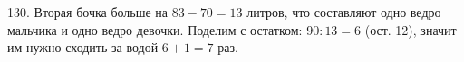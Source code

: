 130. Вторая бочка больше на $83-70=13$ литров, что составляют одно ведро мальчика и одно ведро девочки. Поделим с остатком: $90:13=6$ (ост. 12), значит им нужно сходить за водой $6+1=7$ раз.\\
